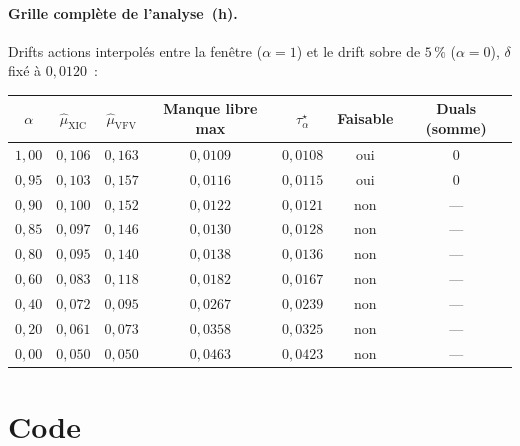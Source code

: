 \documentclass[11pt,letterpaper]{article}
\newcommand{\taustar}{\tau^{\star}}
\theoremstyle{definition}
\begin{document}
\paragraph{Grille complète de l'analyse~(h).}
Drifts actions interpolés entre la fenêtre ($\alpha=1$) et le drift sobre de
$5\,\%$ ($\alpha=0$), $\delta$ fixé à $0{,}0120$~:

\begin{center}
\begin{tabular}{ccccccc}
\toprule
$\alpha$ & $\hat\mu_{\mathrm{XIC}}$ & $\hat\mu_{\mathrm{VFV}}$ &
Manque libre max & $\taustar_\alpha$ & Faisable & Duals (somme) \\
\midrule
$1{,}00$ & $0{,}106$ & $0{,}163$ & $0{,}0109$ & $0{,}0108$ & oui & $0$ \\
$0{,}95$ & $0{,}103$ & $0{,}157$ & $0{,}0116$ & $0{,}0115$ & oui & $0$ \\
$0{,}90$ & $0{,}100$ & $0{,}152$ & $0{,}0122$ & $0{,}0121$ & non & --- \\
$0{,}85$ & $0{,}097$ & $0{,}146$ & $0{,}0130$ & $0{,}0128$ & non & --- \\
$0{,}80$ & $0{,}095$ & $0{,}140$ & $0{,}0138$ & $0{,}0136$ & non & --- \\
$0{,}60$ & $0{,}083$ & $0{,}118$ & $0{,}0182$ & $0{,}0167$ & non & --- \\
$0{,}40$ & $0{,}072$ & $0{,}095$ & $0{,}0267$ & $0{,}0239$ & non & --- \\
$0{,}20$ & $0{,}061$ & $0{,}073$ & $0{,}0358$ & $0{,}0325$ & non & --- \\
$0{,}00$ & $0{,}050$ & $0{,}050$ & $0{,}0463$ & $0{,}0423$ & non & --- \\
\bottomrule
\end{tabular}
\end{center}

\section{Code}\label{app:code}
\end{document}
